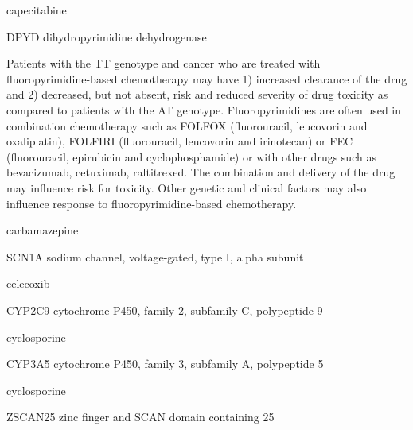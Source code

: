 \documentclass{resume} %
\begin{document}
\begin{rSection}{ capecitabine }
\begin{rSubsection}{ DPYD }{ dihydropyrimidine dehydrogenase }{}{}
\item[] Patients with the TT genotype and cancer who are treated with fluoropyrimidine-based chemotherapy may have 1) increased clearance of the drug and 2) decreased, but not absent, risk and reduced severity of drug toxicity as compared to patients with the AT genotype. Fluoropyrimidines are often used in combination chemotherapy such as FOLFOX (fluorouracil, leucovorin and oxaliplatin), FOLFIRI (fluorouracil, leucovorin and irinotecan) or FEC (fluorouracil, epirubicin and cyclophosphamide) or with other drugs such as bevacizumab, cetuximab, raltitrexed. The combination and delivery of the drug may influence risk for toxicity. Other genetic and clinical factors may also influence response to fluoropyrimidine-based chemotherapy.

\end{rSubsection}

\end{rSection}\begin{rSection}{ carbamazepine }
\item[]
\begin{rSubsection}{ SCN1A }{ sodium channel, voltage-gated, type I, alpha subunit }{}{}
\item[]


\end{rSubsection}

\end{rSection}\begin{rSection}{ celecoxib }
\item[]
\begin{rSubsection}{ CYP2C9 }{ cytochrome P450, family 2, subfamily C, polypeptide 9 }{}{}
\item[]


\end{rSubsection}

\end{rSection}\begin{rSection}{ cyclosporine }
\item[]
\begin{rSubsection}{ CYP3A5 }{ cytochrome P450, family 3, subfamily A, polypeptide 5 }{}{}
\item[]


\end{rSubsection}

\end{rSection}\begin{rSection}{ cyclosporine }
\item[]
\begin{rSubsection}{ ZSCAN25 }{ zinc finger and SCAN domain containing 25 }{}{}
\item[]



\end{rSubsection}
\end{rSection}
\end{document}
